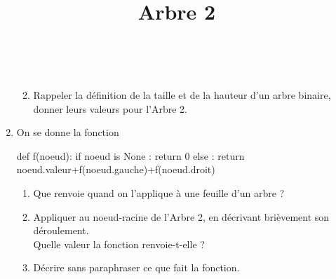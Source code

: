 \documentclass[11pt,a4paper,french,twoside]{PMCours}
\begin{document}
\begin{enumerate}
\begin{enumerate}
\begin{center}
\\
\title{Arbre 2}
\end{center}
\item Rappeler la définition de la taille et de la hauteur d'un arbre binaire, donner leurs valeurs pour l'Arbre 2.
\end{enumerate}
\item On se donne la fonction 
\begin{Python}
def f(noeud):
	if noeud is None :
		return 0
	else :
		return noeud.valeur+f(noeud.gauche)+f(noeud.droit)
\end{Python} 
\begin{enumerate}
\item Que renvoie  quand on l'applique à une feuille d'un arbre ? 
\item Appliquer  au noeud-racine de l'Arbre 2, en décrivant brièvement son déroulement.\\ Quelle valeur la fonction renvoie-t-elle ? 
\item Décrire sans paraphraser ce que fait la fonction.
\end{enumerate} 
\end{enumerate}
\end{document}

